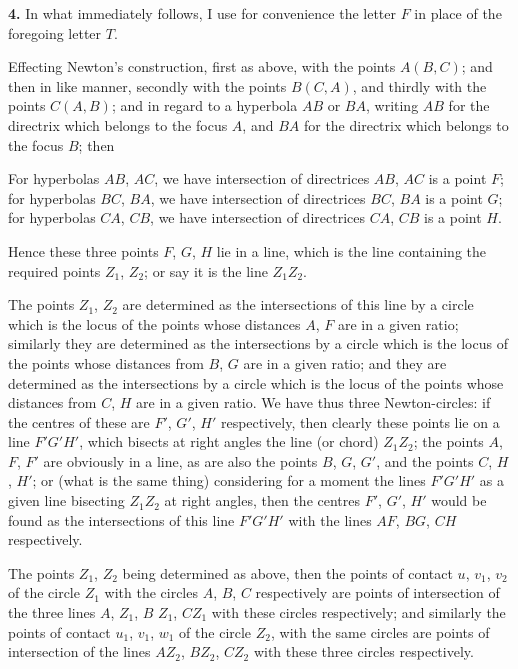 \documentclass[11pt,a4paper]{article}
\begin{document}
\textbf{4.} In what immediately follows, I use for convenience the letter $F$ in place of the foregoing letter $T$.

Effecting Newton's construction, first as above, with the points $A(B, C)$; and then in like manner, secondly with the points $B(C, A)$, and thirdly with the points $C(A, B)$; and in regard to a hyperbola $AB$ or $BA$, writing $AB$ for the directrix which belongs to the focus $A$, and $BA$ for the directrix which belongs to the focus $B$; then

For hyperbolas $AB$, $AC$, we have intersection of directrices $AB$, $AC$ is a point $F$; for hyperbolas $BC$, $BA$, we have intersection of directrices $BC$, $BA$ is a point $G$; for hyperbolas $CA$, $CB$, we have intersection of directrices $CA$, $CB$ is a point $H$.

Hence these three points $F$, $G$, $H$ lie in a line, which is the line containing the required points $Z_1$, $Z_2$; or say it is the line $Z_1 Z_2$.

The points $Z_1$, $Z_2$ are determined as the intersections of this line by a circle which is the locus of the points whose distances $A$, $F$ are in a given ratio; similarly they are determined as the intersections by a circle which is the locus of the points whose distances from $B$, $G$ are in a given ratio; and they are determined as the intersections by a circle which is the locus of the points whose distances from $C$, $H$ are in a given ratio. We have thus three Newton-circles: if the centres of these are $F'$, $G'$, $H'$ respectively, then clearly these points lie on a line $F'G'H'$, which bisects at right angles the line (or chord) $Z_1 Z_2$; the points $A$, $F$, $F'$ are obviously in a line, as are also the points $B$, $G$, $G'$, and the points $C$, $H$, $H'$; or (what is the same thing) considering for a moment the lines $F'G'H'$ as a given line bisecting $Z_1 Z_2$ at right angles, then the centres $F'$, $G'$, $H'$ would be found as the intersections of this line $F'G'H'$ with the lines $AF$, $BG$, $CH$ respectively.

The points $Z_1$, $Z_2$ being determined as above, then the points of contact $u$, $v_1$, $v_2$ of the circle $Z_1$ with the circles $A$, $B$, $C$ respectively are points of intersection of the three lines $A$, $Z_1$, $B$ $Z_1$, $CZ_1$ with these circles respectively; and similarly the points of contact $u_1$, $v_1$, $w_1$ of the circle $Z_2$, with the same circles are points of intersection of the lines $AZ_2$, $BZ_2$, $CZ_2$ with these three circles respectively.
\end{document}
